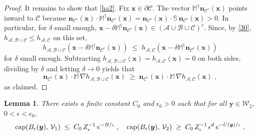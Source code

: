 \documentclass[reqno]{amsart}
\newtheorem{lemma}[theorem]{Lemma}
\newcounter{as}[section]
\newcommand{\mc}[1]{{\mathcal #1}}
\newcommand{\bb}[1]{{\mathbb #1}}
\newcommand{\bs}[1]{{\boldsymbol #1}}
\newcommand{\<}{\langle}
\renewcommand{\>}{\rangle}
\begin{document}
\begin{proof}
It remains to show that \eqref{ha2}. Fix $\bs x \in \partial \mc C$.  The vector $\bb
M^\dagger \bs n_{\mc C^c} (\bs x)$ points inward to $\mc C$ because
$\bs n_{\mc C^c} (\bs x) \cdot \bb M^\dagger \bs n_{\mc C^c} (\bs x) =
\bs n_{\mc C^c} (\bs x) \cdot \bb S \,\bs n_{\mc C^c} (\bs x)>0$. In
particular, for $\delta$ small enough, $\bs x -\delta \bb M^\dagger
\bs n_{\mc C^c} (\bs x) \in (\mc A \cup \mc B\cup\mc C)^c$. Since, by
\eqref{30}, $h_{\mc A, \mc B\cup\mc C} \le h_{\mc A, \mc C}$ on this
set,
\begin{equation*}
h_{\mc A, \mc B\cup\mc C} (\bs x -\delta \bb M^\dagger
\bs n_{\mc C^c} (\bs x))
\;\le\; h_{\mc A, \mc C} (\bs x -\delta \bb M^\dagger
\bs n_{\mc C^c} (\bs x))
\end{equation*}
for $\delta$ small enough. Subtracting $h_{\mc A, \mc B\cup\mc C} (\bs
x) = h_{\mc A, \mc C} (\bs x) =0$ on both sides, dividing by $\delta$
and letting $\delta\to 0$ yields that
\begin{equation*}
\bs n_{\mc C^c} (\bs x) \cdot \bb M \, \nabla h_{\mc A, \mc B\cup\mc C} (\bs x)
\;\ge\; \bs n_{\mc C^c} (\bs x) \cdot \bb M \,  \nabla  h_{\mc A, \mc C} (\bs x) \;,
\end{equation*}
as claimed.
\end{proof}

\begin{lemma}
\label{7-l10}
There exists a finite constant $C_0$ and $\epsilon_0>0$ such that for
all $\bs y\in \mc W_2$, $0<\epsilon<\epsilon_0$,
\begin{equation*}
\textup{cap} (B_{\epsilon}(\boldsymbol{y}),\,\mathcal{V}_{1})
\; \le\; {C_0}\,{Z_\epsilon^{-1}} \, e^{-H/\epsilon}\;, \quad
\textup{cap} (B_{\epsilon}(\boldsymbol{y}),\,\mathcal{V}_{2})
\;\ge\; {C_0}\,{Z_\epsilon^{-1}} \, \epsilon^{d} \,
e^{-U(\boldsymbol{y})/\epsilon}\; .
\end{equation*}
\end{lemma}
\end{document}
